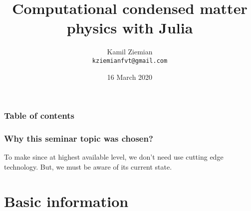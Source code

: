 \documentclass[10pt,t]{beamer}
\title{Computational condensed matter physics with Julia}
\author{Kamil Ziemian \\
  \texttt{kziemianfvt@gmail.com}}
\institute{Uniwersytet Jagielloński w~Krakowie}
\date{16 March 2020}
\begin{document}






\RaggedRight





\maketitle %





\begin{frame}
  \frametitle{Table of contents}


  \tableofcontents %

\end{frame}





\begin{frame}
  \frametitle{Why this seminar topic was chosen?}


  \begingroup

  \large

  To make since at highest available level, we don't need use cutting edge
  technology. But, we must be aware of its current state.

  \endgroup

\end{frame}










\section{Basic information}
\end{document}
